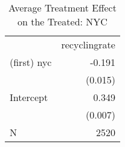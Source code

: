 \documentclass{article}
\begin{document}
\begin{table}[!h]
\caption{Average Treatment Effect on the Treated: NYC}
\centering
\begin{tabular}{ll}
\cline{1-2}
\multicolumn{1}{r}{} &
  \multicolumn{1}{c}{recyclingrate} \\
\cline{1-2}
\multicolumn{1}{l}{(first) nyc} &
  \multicolumn{1}{r}{-0.191} \\
\multicolumn{1}{l}{} &
  \multicolumn{1}{r}{(0.015)} \\
\multicolumn{1}{l}{Intercept} &
  \multicolumn{1}{r}{0.349} \\
\multicolumn{1}{l}{} &
  \multicolumn{1}{r}{(0.007)} \\
\multicolumn{1}{l}{N} &
  \multicolumn{1}{r}{2520} \\
\cline{1-2}
\end{tabular}
\end{table}
\end{document}
